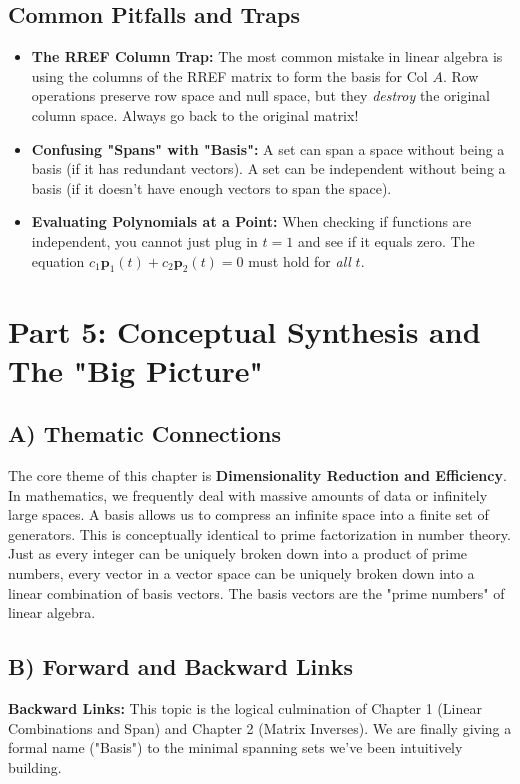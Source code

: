 \documentclass[12pt]{article}
\begin{document}
\subsection{Common Pitfalls and Traps}
\begin{itemize}
    \item \textbf{The RREF Column Trap:} The most common mistake in linear algebra is using the columns of the RREF matrix to form the basis for Col $A$. Row operations preserve row space and null space, but they \textit{destroy} the original column space. Always go back to the original matrix!
    \item \textbf{Confusing "Spans" with "Basis":} A set can span a space without being a basis (if it has redundant vectors). A set can be independent without being a basis (if it doesn't have enough vectors to span the space).
    \item \textbf{Evaluating Polynomials at a Point:} When checking if functions are independent, you cannot just plug in $t=1$ and see if it equals zero. The equation $c_1\mathbf{p}_1(t) + c_2\mathbf{p}_2(t) = 0$ must hold for \textit{all} $t$.
\end{itemize}

\newpage
\section{Part 5: Conceptual Synthesis and The "Big Picture"}

\subsection{A) Thematic Connections}
The core theme of this chapter is \textbf{Dimensionality Reduction and Efficiency}. In mathematics, we frequently deal with massive amounts of data or infinitely large spaces. A basis allows us to compress an infinite space into a finite set of generators. 
This is conceptually identical to prime factorization in number theory. Just as every integer can be uniquely broken down into a product of prime numbers, every vector in a vector space can be uniquely broken down into a linear combination of basis vectors. The basis vectors are the "prime numbers" of linear algebra.

\subsection{B) Forward and Backward Links}
\textbf{Backward Links:} This topic is the logical culmination of Chapter 1 (Linear Combinations and Span) and Chapter 2 (Matrix Inverses). We are finally giving a formal name ("Basis") to the minimal spanning sets we've been intuitively building.
\end{document}
